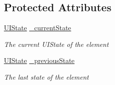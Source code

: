 \subsection*{Protected Attributes}
\begin{DoxyCompactItemize}
\item 
\hyperlink{namespace_m_b2_d_1_1_u_i_a3d5fed7e80959a1444165894dfd9e75b}{U\+I\+State} \hyperlink{class_m_b2_d_1_1_u_i_1_1_u_i_control_element_a20ac4c2a32e73de2457240bf42f512fa}{\+\_\+current\+State}
\begin{DoxyCompactList}\small\item\em The current U\+I\+State of the element \end{DoxyCompactList}\item 
\hyperlink{namespace_m_b2_d_1_1_u_i_a3d5fed7e80959a1444165894dfd9e75b}{U\+I\+State} \hyperlink{class_m_b2_d_1_1_u_i_1_1_u_i_control_element_a3a1c1743b02d8d2daa00231d5bb41067}{\+\_\+previous\+State}
\begin{DoxyCompactList}\small\item\em The last state of the element \end{DoxyCompactList}\end{DoxyCompactItemize}
